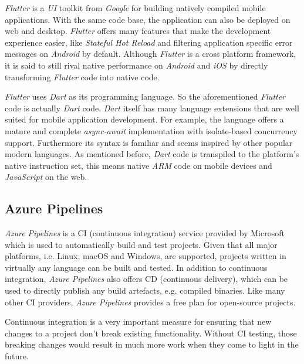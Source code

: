 \textit{Flutter} is a \textit{UI} toolkit from \textit{Google} for building natively compiled mobile
applications. With the same code base, the application can also be deployed on web and desktop.
\textit{Flutter} offers many features that make the development experience easier, like
\textit{Stateful Hot Reload} and filtering application specific error messages on \textit{Android}
by default. Although \textit{Flutter} is a cross platform framework, it is said to still rival
native performance on \textit{Android} and \textit{iOS} by directly transforming \textit{Flutter}
code into native code.
\cite{flutter}

\textit{Flutter} uses \textit{Dart} as its programming language. So the aforementioned \textit{Flutter}
code is actually \textit{Dart} code. \textit{Dart} itself has many language extensions that are well
suited for mobile application development. For example, the language offers a mature and complete
\textit{async-await} implementation with isolate-based concurrency support. Furthermore its syntax
is familiar and seems inspired by other popular modern languages. As mentioned before, \textit{Dart}
code is transpiled to the platform's native instruction set, this means native \textit{ARM} code on
mobile devices and \textit{JavaScript} on the web. \cite{dart}

\subsection{Azure Pipelines}

\textit{Azure Pipelines} is a CI (continuous integration) service provided by Microsoft which is
used to automatically build and test projects. Given that all major platforms, i.e. Linux, macOS and
Windows, are supported, projects written in virtually any language can be built and tested. In
addition to continuous integration, \textit{Azure Pipelines} also offers CD (continuous delivery),
which can be used to directly publish any build artefacts, e.g. compiled binaries. Like many other
CI providers, \textit{Azure Pipelines} provides a free plan for open-source projects.
\cite{azure-pipelines}

Continuous integration is a very important measure for ensuring that new changes to a project don't
break existing functionality. Without CI testing, those breaking changes would result in much more
work when they come to light in the future.
